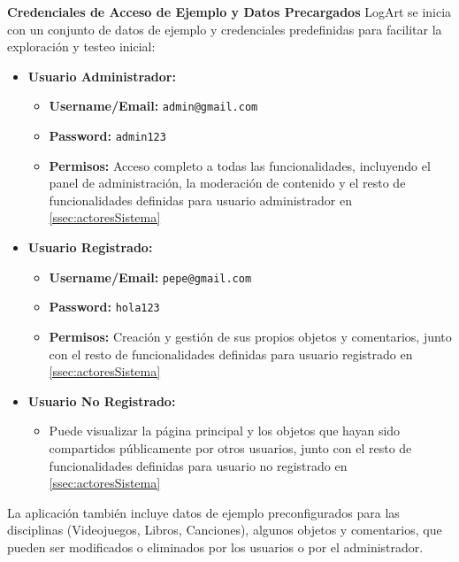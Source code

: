 \textbf{Credenciales de Acceso de Ejemplo y Datos Precargados}
\label{appA:credencialesDatos}
LogArt se inicia con un conjunto de datos de ejemplo y credenciales predefinidas para facilitar la exploración y testeo inicial:

\begin{itemize}
    \item \textbf{Usuario Administrador:}
    \begin{itemize}
        \item \textbf{Username/Email:}
        \texttt{admin@gmail.com}
        \item \textbf{Password:} \texttt{admin123}
        \item \textbf{Permisos:} Acceso completo a todas las funcionalidades, incluyendo el panel de administración, la moderación de contenido y el resto de funcionalidades definidas para usuario administrador en \ref{ssec:actoresSistema}
    \end{itemize}
    \item \textbf{Usuario Registrado:}
    \begin{itemize}
        \item \textbf{Username/Email:}
        \texttt{pepe@gmail.com}
        \item \textbf{Password:} \texttt{hola123}
        \item \textbf{Permisos:} Creación y gestión de sus propios objetos y comentarios, junto con el resto de funcionalidades definidas para usuario registrado en \ref{ssec:actoresSistema}
    \end{itemize}
    \item \textbf{Usuario No Registrado:}
        \begin{itemize}
            \item Puede visualizar la página principal y los objetos que hayan sido compartidos públicamente por otros usuarios, junto con el resto de funcionalidades definidas para usuario no registrado en \ref{ssec:actoresSistema}
        \end{itemize}
\end{itemize}

La aplicación también incluye datos de ejemplo preconfigurados para las disciplinas (Videojuegos, Libros, Canciones), algunos objetos y comentarios, que pueden ser modificados o eliminados por los usuarios o por el administrador.

